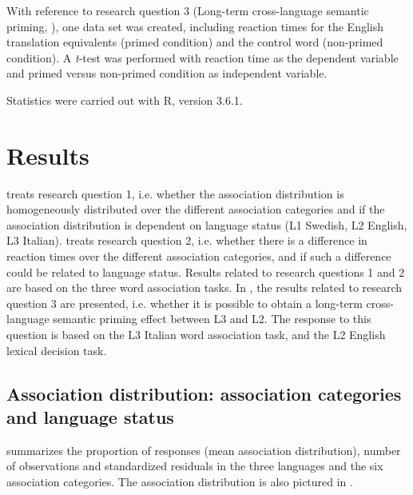 \documentclass[output=paper,colorlinks,citecolor=brown,nonflat]{langsci/langscibook}
\begin{document}
 With reference to research question 3 (Long-term cross-language semantic priming, ), one data set was created, including reaction times for the English translation equivalents (primed condition) and the control word (non-primed condition). A \textit{t}-test was performed with reaction time as the dependent variable and primed versus non-primed condition as independent variable.

Statistics were carried out with R, version 3.6.1.

\section{Results}\label{sec:gudmundson:3}

 treats research question 1, i.e. whether the association distribution is homogeneously distributed over the different association categories and if the association distribution is dependent on language status (L1 Swedish, L2 English, L3 Italian).  treats research question 2, i.e. whether there is a difference in reaction times over the different association categories, and if such a difference could be related to language status. Results related to research questions 1 and 2 are based on the three word association tasks. In , the results related to research question 3 are presented, i.e. whether it is possible to obtain a long-term cross-language semantic priming effect between L3 and L2. The response to this question is based on the L3 Italian word association task, and the L2 English lexical decision task.

\subsection{Association distribution: association categories and language status}\label{sec:gudmundson:3.1}

 summarizes the proportion of responses (mean association distribution), number of observations and standardized residuals in the three languages and the six association categories. The association distribution is also pictured in .
\end{document}
